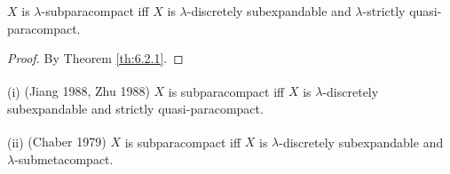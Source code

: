 \documentclass[jisng6ii.tex]{subfiles}
\begin{document}
{\theorem{\label{th:6.2.3}}  $X$ is $\lambda$-subparacompact iff $X$ is 
$\lambda$-discretely subexpandable and $\lambda$-strictly quasi-paracompact.
}

\begin{proof} 
	By Theorem \ref{th:6.2.1}.
\end{proof}

{\corollary{} \label{cor:6.2.4}
\textup{(i)} \textup{(\hstretch{1.8}{[}Jiang 1988\hstretch{1.8}{]}\textsuperscript{\cite{Jiang1988}}, 
	\hstretch{1.8}{[}Zhu 1988\hstretch{1.8}{]}\textsuperscript{\cite{Zhu1988}})}
 $X$ is subparacompact iff $X$ is $\lambda$-discretely subexpandable and 
 strictly quasi-paracompact. 
 
\textup{(ii)} \textup{(\hstretch{1.8}{[}Chaber 1979\hstretch{1.8}{]}\textsuperscript{\cite{Chaber}})}
$X$ is subparacompact iff $X$ is $\lambda$-discretely subexpandable 
and $\lambda$-submetacompact. \hfill\qedsymbol
}
\end{document}

